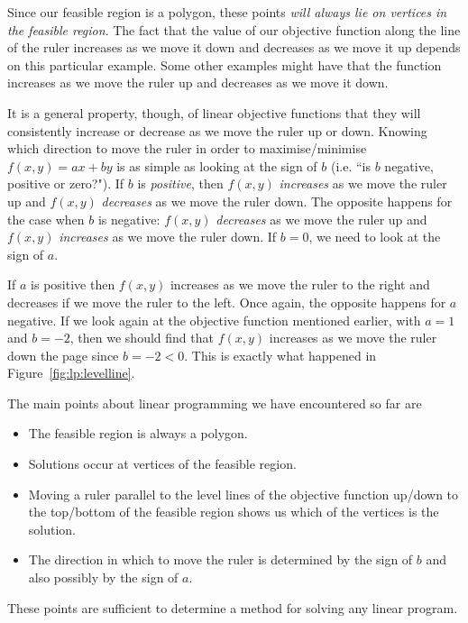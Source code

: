 Since our feasible region is a polygon, these points \textit{will always lie on vertices in the feasible region}. The fact that the value of our objective function along the line of the ruler increases as we move it down and decreases as we move it up depends on this particular example. Some other examples might have that the function increases as we move the ruler up and decreases as we move it down. 

It is a general property, though, of linear objective functions that they will consistently increase or decrease as we move the ruler up or down. Knowing which direction to move the ruler in order to maximise/minimise $f(x,y)=ax+by$ is as simple as looking at the sign of $b$ (i.e. ``is $b$ negative, positive or zero?"). If $b$ is \textit{positive}, then $f(x,y)$ \textit{increases} as we move the ruler up and $f(x,y)$ \textit{decreases} as we move the ruler down. The opposite happens for the case when $b$ is negative: $f(x,y)$ \textit{decreases} as we move the ruler up and $f(x,y)$ \textit{increases} as we move the ruler down. If $b=0$, we need to look at the sign of $a$. 

If $a$ is positive then $f(x,y)$ increases as we move the ruler to the right and decreases if we move the ruler to the left. Once again, the opposite happens for $a$ negative. If we look again at the objective function mentioned earlier,
with $a=1$ and $b=-2$, then we should find that $f(x,y)$ increases as we move the ruler down the page since $b=-2<0$. This is exactly what happened in Figure~\ref{fig:lp:levelline}.

The main points about linear programming we have encountered so far are
\begin{itemize}
\item The feasible region is always a polygon.
\item Solutions occur at vertices of the feasible region.
\item Moving a ruler parallel to the level lines of the objective function up/down to the top/bottom of the feasible region shows us which of the vertices is the solution.
\item The direction in which to move the ruler is determined by the sign of $b$ and also possibly by the sign of $a$.
\end{itemize}

These points are sufficient to determine a method for solving any linear program. 

